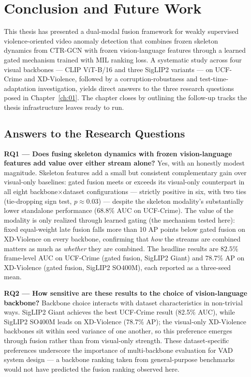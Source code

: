 \chapter{Conclusion and Future Work}
\label{ch:09}

This thesis has presented a dual-modal fusion framework for weakly supervised
violence-oriented video anomaly detection that combines frozen skeleton
dynamics from CTR-GCN with frozen vision-language features through a learned
gated mechanism trained with MIL ranking loss. A systematic study across four
visual backbones --- CLIP ViT-B/16 and three SigLIP2 variants --- on UCF-Crime
and XD-Violence, followed by a corruption-robustness and test-time-adaptation
investigation, yields direct answers to the three research questions posed in
Chapter~\ref{ch:01}. The chapter closes by outlining the follow-up tracks the
thesis infrastructure leaves ready to run.

\section{Answers to the Research Questions}
\label{sec:conc-rq}

\textbf{RQ1 --- Does fusing skeleton dynamics with frozen vision-language
features add value over either stream alone?} Yes, with an honestly modest
magnitude. Skeleton features add a small but consistent complementary gain
over visual-only baselines: gated fusion meets or exceeds its visual-only
counterpart in all eight backbone$\times$dataset configurations --- strictly
positive in six, with two ties (tie-dropping sign test, $p \approx 0.03$) ---
despite the skeleton modality's substantially lower standalone performance
(68.8\% AUC on UCF-Crime). The value of the modality is only realized through
learned gating (the mechanism tested here): fixed equal-weight late fusion falls more
than 10 AP points below gated fusion on XD-Violence on every backbone,
confirming that \emph{how} the streams are combined matters as much as
\emph{whether} they are combined. The headline results are $82.5$\% frame-level
AUC on UCF-Crime (gated fusion, SigLIP2 Giant) and $78.7$\% AP on XD-Violence
(gated fusion, SigLIP2 SO400M), each reported as a three-seed mean.

\textbf{RQ2 --- How sensitive are these results to the choice of
vision-language backbone?} Backbone choice interacts with dataset
characteristics in non-trivial ways. SigLIP2 Giant achieves the best UCF-Crime
result (82.5\% AUC), while SigLIP2 SO400M leads on XD-Violence (78.7\% AP);
the visual-only XD-Violence backbones sit within seed variance of one another,
so this preference emerges through fusion rather than from visual-only
strength. These dataset-specific preferences underscore the importance of
multi-backbone evaluation for VAD system design --- a backbone ranking taken
from general-purpose benchmarks would not have predicted the fusion ranking
observed here.

